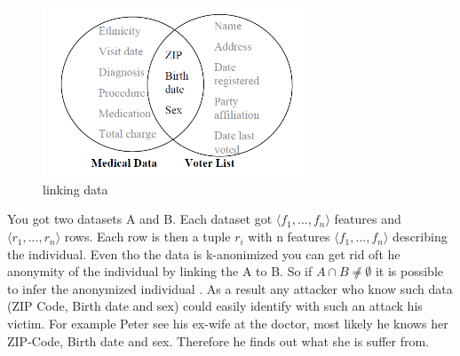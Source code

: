 \documentclass{llncs}
\begin{document}
\begin{figure}[]
	\centering
	\includegraphics[width=0.7\textwidth]{linkingdata.png}
	\caption{linking data}%
	\label{quasiidentifier}
\end{figure}
You got two datasets A and B. Each dataset got \ensuremath{\langle f_1, ... ,f_n \rangle} features and \ensuremath{\langle r_1, ... ,r_n \rangle} rows.
Each row is then a tuple \ensuremath{r_i} with n features \ensuremath{\langle f_1, ... ,f_n \rangle} describing the individual.
Even tho the data is k-anonimized you can get rid oft he anonymity of the individual by linking the A to B. So if \ensuremath{A \cap B \not \neq \emptyset} it is possible to infer the anonymized individual \cite{sweeney2002k}.
As a result any attacker who know such data (ZIP Code, Birth date and sex) could easily identify with such an attack his victim. For example Peter see his ex-wife at the doctor, most likely he knows her ZIP-Code, Birth date and sex. Therefore he finds out what she is suffer from. 
\end{document}
